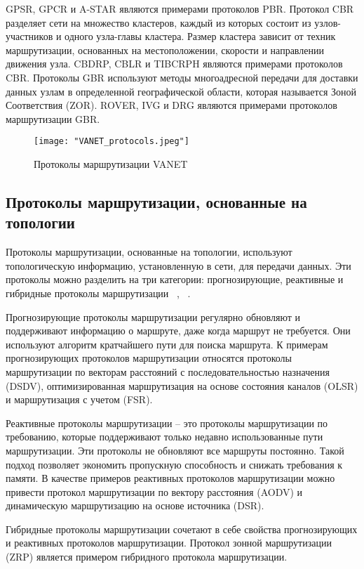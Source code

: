GPSR, GPCR и A-STAR являются примерами протоколов PBR. Протокол CBR разделяет сети на множество кластеров, каждый из которых состоит из узлов-участников и одного узла-главы кластера. Размер кластера зависит от техник маршрутизации, основанных на местоположении, скорости и направлении движения узла. CBDRP, CBLR и TIBCRPH являются примерами протоколов CBR. Протоколы GBR используют методы многоадресной передачи для доставки данных узлам в определенной географической области, которая называется Зоной Соответствия (ZOR). ROVER, IVG и DRG являются примерами протоколов маршрутизации GBR.

\begin{figure}[!h]
    \centering
    \texttt{[image: "VANET\_protocols.jpeg"]}
    \caption{Протоколы маршрутизации VANET}
    \label{fig:vanet_protocols}
\end{figure}

\subsection*{Протоколы маршрутизации, основанные на топологии}

Протоколы маршрутизации, основанные на топологии, используют топологическую информацию, установленную в сети, для передачи данных. Эти протоколы можно разделить на три категории: прогнозирующие, реактивные и гибридные протоколы маршрутизации ~\cite{kaur2013comparative}, ~\cite{garg2012review}.

Прогнозирующие протоколы маршрутизации регулярно обновляют и поддерживают информацию о маршруте, даже когда маршрут не требуется. Они используют алгоритм кратчайшего пути для поиска маршрута. К примерам прогнозирующих протоколов маршрутизации относятся протоколы маршрутизации по векторам расстояний с последовательностью назначения (DSDV), оптимизированная маршрутизация на основе состояния каналов (OLSR) и маршрутизация с учетом  (FSR).

Реактивные протоколы маршрутизации – это протоколы маршрутизации по требованию, которые поддерживают только недавно использованные пути маршрутизации. Эти протоколы не обновляют все маршруты постоянно. Такой подход позволяет экономить пропускную способность и снижать требования к памяти. В качестве примеров реактивных протоколов маршрутизации можно привести протокол маршрутизации по вектору расстояния  (AODV) и динамическую маршрутизацию на основе источника (DSR).

Гибридные протоколы маршрутизации сочетают в себе свойства прогнозирующих и реактивных протоколов маршрутизации. Протокол зонной маршрутизации (ZRP) является примером гибридного протокола маршрутизации.

